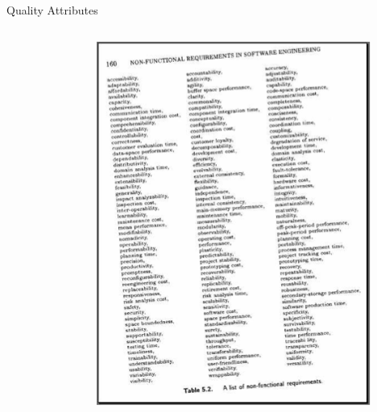 \documentclass[10pt,t,a4paper]{beamer}
\begin{document}
\begin{frame}[shrink=35,label=sec-1-8]{Quality Attributes}
\begin{columns}
\begin{column}{0.7\textwidth}
\begin{verse}
\end{verse}
\end{column}
\begin{column}{0.2\textwidth}
\includegraphics[width=9cm]{./IQualityAttributes.png}
\end{column}
\end{columns}
\end{frame}
\end{document}
